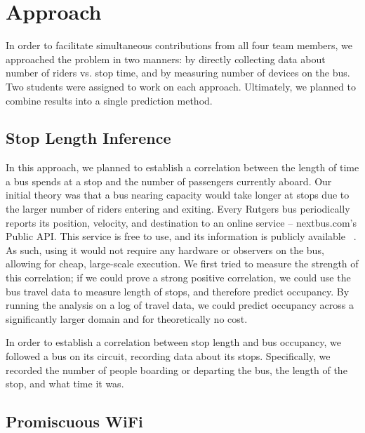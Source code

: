 \section{Approach}

In order to facilitate simultaneous contributions from all four team members, we approached the problem in two manners: by directly collecting data about number of riders vs. stop time, and by measuring number of devices on the bus.
Two students were assigned to work on each approach.
Ultimately, we planned to combine results into a single prediction method.

\subsection{Stop Length Inference}

In this approach, we planned to establish a correlation between the length of time a bus spends at a stop and the number of passengers currently aboard.
Our initial theory was that a bus nearing capacity would take longer at stops due to the larger number of riders entering and exiting.
Every Rutgers bus periodically reports its position, velocity, and destination to an online service -- nextbus.com's Public API.
This service is free to use, and its information is publicly available ~\cite{nextbus}. %
As such, using it would not require any hardware or observers on the bus, allowing for cheap, large-scale execution.
We first tried to measure the strength of this correlation; if we could prove a strong positive correlation, we could use the bus travel data to measure length of stops, and therefore predict occupancy.
By running the analysis on a log of travel data, we could predict occupancy across a significantly larger domain and for theoretically no cost.

In order to establish a correlation between stop length and bus occupancy, we followed a bus on its circuit, recording data about its stops. Specifically, we recorded the number of people boarding or departing the bus, the length of the stop, and what time it was.

\subsection{Promiscuous WiFi}


